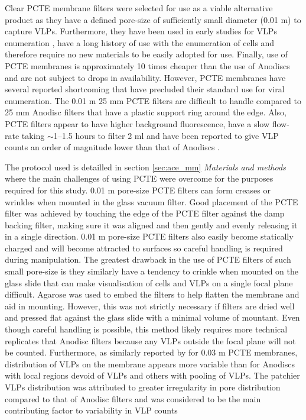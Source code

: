 Clear \ac{PCTE} membrane filters were selected for use as a viable alternative product as they have a defined pore-size of sufficiently small diameter (0.01 \textmu{}m) to capture \acp{VLP}. 
Furthermore, they have been used in early studies for \acp{VLP} enumeration \cite{Hara1991, Proctor1992}, have a long history of use with the enumeration of cells \cite{Hobbie1977} and therefore require no new materials to be easily adopted for use.
Finally, use of \ac{PCTE} membranes is approximately 10 times cheaper than the use of Anodiscs and are not subject to drops in availability.
However, \ac{PCTE} membranes have several reported shortcoming that have precluded their standard use for viral enumeration.
The 0.01 \textmu{}m 25 mm \ac{PCTE} filters are difficult to handle compared to 25 mm Anodisc filters that have a plastic support ring around the edge.
Also, \ac{PCTE} filters appear to have higher background fluorescence, have a slow flow-rate taking $\sim$1--1.5 hours to filter 2 ml \cite{Hara1991} and have been reported to give \ac{VLP} counts an order of magnitude lower than that of Anodiscs \cite{Budinoff2011}.%

The protocol used is detailled in section \ref{sec:ace_mm} \emph{Materials and methods} where the main challenges of using \ac{PCTE} were overcome for the purposes required for this study.
0.01 \textmu{}m pore-size \ac{PCTE} filters can form creases or wrinkles when mounted in the glass vacuum filter.
Good placement of the \ac{PCTE} filter was achieved by touching the edge of the \ac{PCTE} filter against the damp backing filter, making sure it was aligned and then gently and evenly releasing it in a single direction. 
0.01 \textmu{}m pore-size \ac{PCTE} filters also easily become statically charged and will become attracted to surfaces so careful handling is required during manipulation. 
The greatest drawback in the use of \ac{PCTE} filters of such small pore-size is they similarly have a tendency to crinkle when mounted on the glass slide that can make visualisation of cells and \acp{VLP} on a single focal plane difficult.
Agarose was used to embed the filters to help flatten the membrane and aid in mounting.
However, this was not strictly necessary if filters are dried well and pressed flat against the glass slide with a minimal volume of mountant.
Even though careful handling is possible, this method likely requires more technical replicates that Anodisc filters because any \acp{VLP} outside the focal plane will not be counted.
Furthermore, as similarly reported by \citet{Diemer2012} for 0.03 \textmu{}m \ac{PCTE} membranes, distribution of \acp{VLP} on the membrane appears more variable than for Anodiscs with local regions devoid of \acp{VLP} and others with pooling of \acp{VLP}.
The patchier \acp{VLP} distribution was attributed to greater irregularity in pore distribution compared to that of Anodisc filters and was considered to be the main contributing factor to variability in \ac{VLP} counts \cite{Diemer2012}

